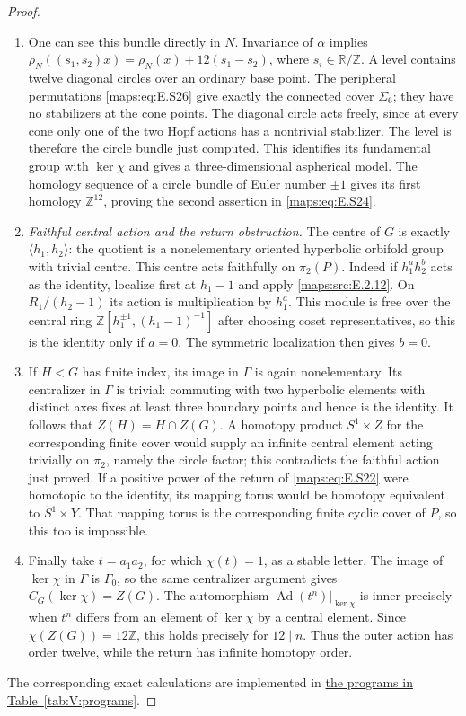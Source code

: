 \documentclass[11pt,a4paper]{article}
\numberwithin{equation}{section}
\theoremstyle{definition}
\begin{document}
\begin{proof}
\begin{enumerate}[label=\arabic*.,leftmargin=*]
\item One can see this bundle directly in $N$. Invariance of
$\alpha$ implies
$\rho_N((s_1,s_2)x)=\rho_N(x)+12(s_1-s_2)$, where
$s_i\in\mathbb R/\mathbb Z$. A level contains twelve
diagonal circles over an ordinary base point. The peripheral
permutations \eqref{maps:eq:E.S26} give exactly the connected cover
$\Sigma_6$; they have no stabilizers at the cone points.
The diagonal circle acts freely, since at every cone only
one of the two Hopf actions has a nontrivial stabilizer.
The level is therefore the circle bundle just computed.
This identifies its fundamental group with $\ker\chi$
and gives a three-dimensional aspherical model.
The homology sequence of a circle bundle of Euler number
$\pm1$ gives its first homology $\mathbb Z^{12}$, proving
the second assertion in \eqref{maps:eq:E.S24}.

\item \emph{Faithful central action and the return obstruction.}
The centre of $G$ is exactly $\langle h_1,h_2\rangle$:
the quotient is a nonelementary oriented hyperbolic orbifold
group with trivial centre. This centre acts faithfully on
$\pi_2(P)$. Indeed if $h_1^a h_2^b$ acts as the identity,
localize first at $h_1-1$ and apply \ref{maps:src:E.2.12}. On
$R_1/(h_2-1)$ its action is multiplication by $h_1^a$.
This module is free over the central ring
$\mathbb Z[h_1^{\pm1},(h_1-1)^{-1}]$ after choosing coset
representatives, so this is the identity only if $a=0$.
The symmetric localization then gives $b=0$.

\item If $H<G$ has finite index, its image in $\Gamma$ is again
nonelementary. Its centralizer in $\Gamma$ is trivial:
commuting with two hyperbolic elements with distinct axes
fixes at least three boundary points and hence is the
identity. It follows that
$Z(H)=H\cap Z(G)$. A homotopy product $S^1\times Z$ for
the corresponding finite cover would supply an infinite
central element acting trivially on $\pi_2$, namely the
circle factor; this contradicts the faithful action just
proved. If a positive power of the return of \eqref{maps:eq:E.S22} were
homotopic to the identity, its mapping torus would be
homotopy equivalent to $S^1\times Y$. That mapping torus
is the corresponding finite cyclic cover of $P$, so this
too is impossible.

\item Finally take $t=a_1a_2$, for which $\chi(t)=1$, as a
stable letter. The image of $\ker\chi$ in $\Gamma$ is
$\Gamma_0$, so the same centralizer argument gives
$C_G(\ker\chi)=Z(G)$. The automorphism
$\operatorname{Ad}(t^n)|_{\ker\chi}$ is inner precisely
when $t^n$ differs from an element of $\ker\chi$ by a
central element. Since $\chi(Z(G))=12\mathbb Z$, this
holds precisely for $12\mid n$. Thus the outer action has
order twelve, while the return has infinite homotopy
order. 

\end{enumerate}
The corresponding exact calculations are implemented in \hyperlink{prog:V:cyclic-cover}{the programs in Table~\ref*{tab:V:programs}}.
\end{proof}
\end{document}
